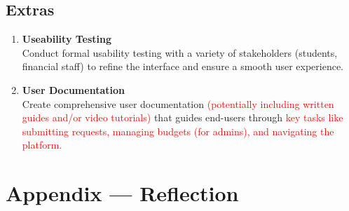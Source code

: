 \documentclass{article}
\begin{document}
\subsection{Extras}

\begin{enumerate}
    \item \textbf{Useability Testing} \\
    Conduct formal usability testing with a variety of stakeholders (students, financial staff) to refine the interface and ensure a smooth user experience.
    \item \textbf{User Documentation} \\
    Create comprehensive user documentation \textcolor{red}{(potentially including written guides and/or video tutorials)} that guides end-users through \textcolor{red}{key tasks like submitting requests, managing budgets (for admins), and navigating the platform.}
\end{enumerate}

\newpage{}

\section*{Appendix --- Reflection}
\end{document}
